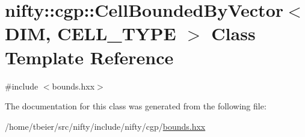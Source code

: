 \hypertarget{classnifty_1_1cgp_1_1CellBoundedByVector}{}\section{nifty\+:\+:cgp\+:\+:Cell\+Bounded\+By\+Vector$<$ D\+IM, C\+E\+L\+L\+\_\+\+T\+Y\+PE $>$ Class Template Reference}
\label{classnifty_1_1cgp_1_1CellBoundedByVector}


{\ttfamily \#include $<$bounds.\+hxx$>$}



The documentation for this class was generated from the following file\+:\begin{DoxyCompactItemize}
\item 
/home/tbeier/src/nifty/include/nifty/cgp/\hyperlink{bounds_8hxx}{bounds.\+hxx}\end{DoxyCompactItemize}
